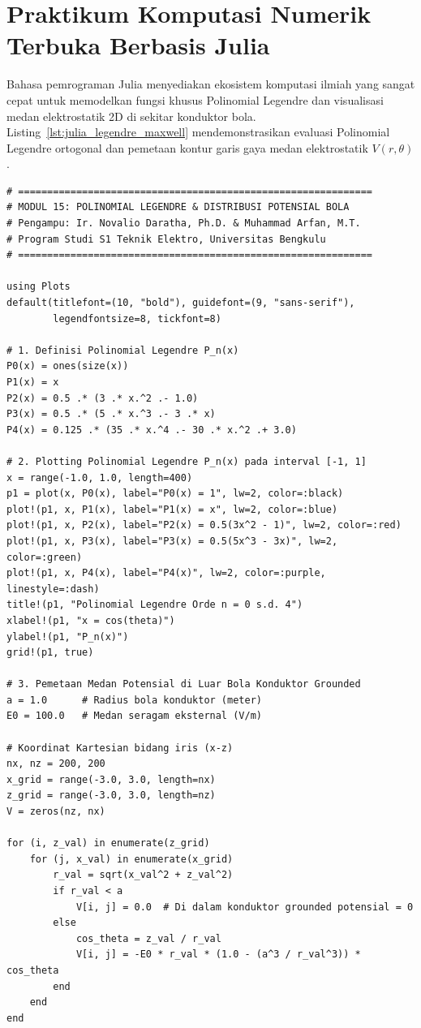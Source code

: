 \documentclass[11pt,a4paper]{article}
\theoremstyle{definition}
\begin{document}
\section{Praktikum Komputasi Numerik Terbuka Berbasis Julia}

Bahasa pemrograman Julia menyediakan ekosistem komputasi ilmiah yang sangat cepat untuk memodelkan fungsi khusus Polinomial Legendre dan visualisasi medan elektrostatik 2D di sekitar konduktor bola. Listing~\eqref{lst:julia_legendre_maxwell} mendemonstrasikan evaluasi Polinomial Legendre ortogonal dan pemetaan kontur garis gaya medan elektrostatik $V(r, \theta)$.

\begin{lstlisting}[caption={Skrip Julia untuk Evaluasi Polinomial Legendre dan Kontur Potensial Bola.}, label={lst:julia_legendre_maxwell}]
# =============================================================
# MODUL 15: POLINOMIAL LEGENDRE & DISTRIBUSI POTENSIAL BOLA
# Pengampu: Ir. Novalio Daratha, Ph.D. & Muhammad Arfan, M.T.
# Program Studi S1 Teknik Elektro, Universitas Bengkulu
# =============================================================

using Plots
default(titlefont=(10, "bold"), guidefont=(9, "sans-serif"), 
        legendfontsize=8, tickfont=8)

# 1. Definisi Polinomial Legendre P_n(x)
P0(x) = ones(size(x))
P1(x) = x
P2(x) = 0.5 .* (3 .* x.^2 .- 1.0)
P3(x) = 0.5 .* (5 .* x.^3 .- 3 .* x)
P4(x) = 0.125 .* (35 .* x.^4 .- 30 .* x.^2 .+ 3.0)

# 2. Plotting Polinomial Legendre P_n(x) pada interval [-1, 1]
x = range(-1.0, 1.0, length=400)
p1 = plot(x, P0(x), label="P0(x) = 1", lw=2, color=:black)
plot!(p1, x, P1(x), label="P1(x) = x", lw=2, color=:blue)
plot!(p1, x, P2(x), label="P2(x) = 0.5(3x^2 - 1)", lw=2, color=:red)
plot!(p1, x, P3(x), label="P3(x) = 0.5(5x^3 - 3x)", lw=2, color=:green)
plot!(p1, x, P4(x), label="P4(x)", lw=2, color=:purple, linestyle=:dash)
title!(p1, "Polinomial Legendre Orde n = 0 s.d. 4")
xlabel!(p1, "x = cos(theta)")
ylabel!(p1, "P_n(x)")
grid!(p1, true)

# 3. Pemetaan Medan Potensial di Luar Bola Konduktor Grounded
a = 1.0      # Radius bola konduktor (meter)
E0 = 100.0   # Medan seragam eksternal (V/m)

# Koordinat Kartesian bidang iris (x-z)
nx, nz = 200, 200
x_grid = range(-3.0, 3.0, length=nx)
z_grid = range(-3.0, 3.0, length=nz)
V = zeros(nz, nx)

for (i, z_val) in enumerate(z_grid)
    for (j, x_val) in enumerate(x_grid)
        r_val = sqrt(x_val^2 + z_val^2)
        if r_val < a
            V[i, j] = 0.0  # Di dalam konduktor grounded potensial = 0
        else
            cos_theta = z_val / r_val
            V[i, j] = -E0 * r_val * (1.0 - (a^3 / r_val^3)) * cos_theta
        end
    end
end


\end{lstlisting}
\end{document}
